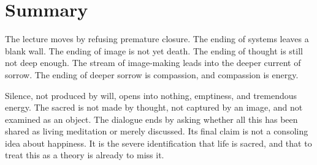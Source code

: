 \section{Summary}

The lecture moves by refusing premature closure. The ending of systems leaves a blank wall. The ending of image is not yet death. The ending of thought is still not deep enough. The stream of image-making leads into the deeper current of sorrow. The ending of deeper sorrow is compassion, and compassion is energy.

Silence, not produced by will, opens into nothing, emptiness, and tremendous energy. The sacred is not made by thought, not captured by an image, and not examined as an object. The dialogue ends by asking whether all this has been shared as living meditation or merely discussed. Its final claim is not a consoling idea about happiness. It is the severe identification that life is sacred, and that to treat this as a theory is already to miss it.